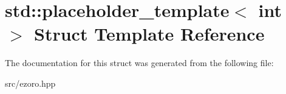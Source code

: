 \hypertarget{structstd_1_1placeholder__template}{\section{std\-:\-:placeholder\-\_\-template$<$ int $>$ Struct Template Reference}
\label{structstd_1_1placeholder__template}
}


The documentation for this struct was generated from the following file\-:\begin{DoxyCompactItemize}
\item 
src/ezoro.\-hpp\end{DoxyCompactItemize}
